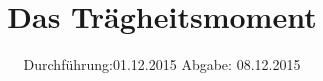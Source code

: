 

\subject{VERSUCH NUMMER 101}
\title{Das Trägheitsmoment}
\date{
  Durchführung:01.12.2015
  \hspace{3em}
  Abgabe: 08.12.2015
}



\maketitle
\thispagestyle{empty}
\tableofcontents
\newpage







\printbibliography


